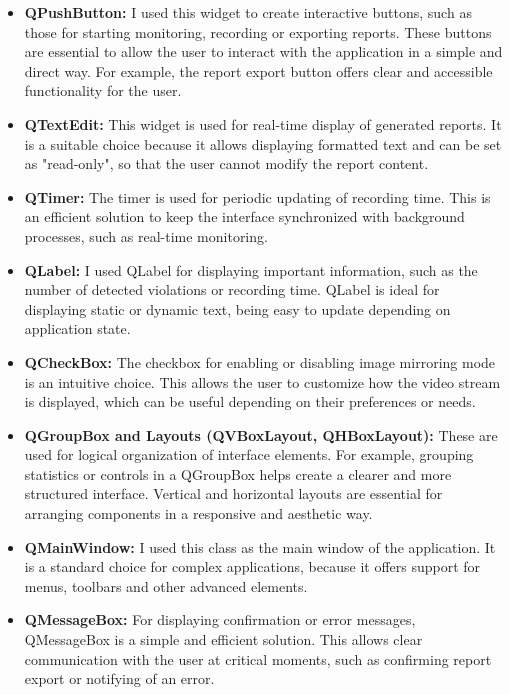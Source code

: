 \documentclass[12pt,a4paper]{article}
\begin{document}
\begin{itemize}
    \item \textbf{QPushButton:} I used this widget to create interactive buttons, such as those for starting monitoring, recording or exporting reports. These buttons are essential to allow the user to interact with the application in a simple and direct way. For example, the report export button offers clear and accessible functionality for the user.

    \item \textbf{QTextEdit:} This widget is used for real-time display of generated reports. It is a suitable choice because it allows displaying formatted text and can be set as "read-only", so that the user cannot modify the report content.

    \item \textbf{QTimer:} The timer is used for periodic updating of recording time. This is an efficient solution to keep the interface synchronized with background processes, such as real-time monitoring.

    \item \textbf{QLabel:} I used QLabel for displaying important information, such as the number of detected violations or recording time. QLabel is ideal for displaying static or dynamic text, being easy to update depending on application state.

    \item \textbf{QCheckBox:} The checkbox for enabling or disabling image mirroring mode is an intuitive choice. This allows the user to customize how the video stream is displayed, which can be useful depending on their preferences or needs.

    \item \textbf{QGroupBox and Layouts (QVBoxLayout, QHBoxLayout):} These are used for logical organization of interface elements. For example, grouping statistics or controls in a QGroupBox helps create a clearer and more structured interface. Vertical and horizontal layouts are essential for arranging components in a responsive and aesthetic way.

    \item \textbf{QMainWindow:} I used this class as the main window of the application. It is a standard choice for complex applications, because it offers support for menus, toolbars and other advanced elements.

    \item \textbf{QMessageBox:} For displaying confirmation or error messages, QMessageBox is a simple and efficient solution. This allows clear communication with the user at critical moments, such as confirming report export or notifying of an error.
\end{itemize}
\end{document}
